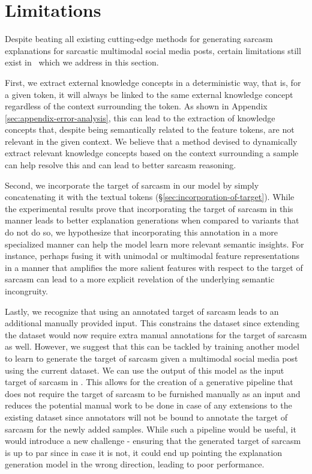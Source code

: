 \section{Limitations} \label{sec:limitations}
Despite beating all existing cutting-edge methods for generating sarcasm explanations for sarcastic multimodal social media posts, certain limitations still exist in \model\ which we address in this section. 

First, we extract external knowledge concepts in a deterministic way, that is, for a given token, it will always be linked to the same external knowledge concept regardless of the context surrounding the token. As shown in Appendix \ref{sec:appendix-error-analysis}, this can lead to the extraction of knowledge concepts that, despite being semantically related to the feature tokens, are not relevant in the given context. We believe that a method devised to dynamically extract relevant knowledge concepts based on the context surrounding a sample can help resolve this and can lead to better sarcasm reasoning. 

Second, we incorporate the target of sarcasm in our model by simply concatenating it with the textual tokens (\S \ref{sec:incorporation-of-target}). While the experimental results prove that incorporating the target of sarcasm in this manner leads to better explanation generations when compared to variants that do not do so, we hypothesize that incorporating this annotation in a more specialized manner can help the model learn more relevant semantic insights. For instance, perhaps fusing it with unimodal or multimodal feature representations in a manner that amplifies the more salient features with respect to the target of sarcasm can lead to a more explicit revelation of the underlying semantic incongruity.

Lastly, we recognize that using an annotated target of sarcasm leads to an additional manually provided input. This constrains the dataset since extending the dataset would now require extra manual annotations for the target of sarcasm as well. However, we suggest that this can be tackled by training another model to learn to generate the target of sarcasm given a multimodal social media post using the current dataset. We can use the output of this model as the input target of sarcasm in \model. This allows for the creation of a generative pipeline that does not require the target of sarcasm to be furnished manually as an input and reduces the potential manual work to be done in case of any extensions to the existing dataset since annotators will not be bound to annotate the target of sarcasm for the newly added samples. While such a pipeline would be useful, it would introduce a new challenge - ensuring that the generated target of sarcasm is up to par since in case it is not, it could end up pointing the explanation generation model in the wrong direction, leading to poor performance.